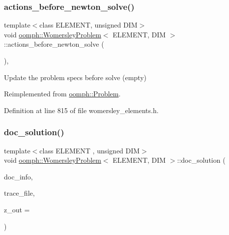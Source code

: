 \subsubsection{\texorpdfstring{actions\+\_\+before\+\_\+newton\+\_\+solve()}{actions\_before\_newton\_solve()}}
{\footnotesize\ttfamily template$<$class E\+L\+E\+M\+E\+NT, unsigned D\+IM$>$ \\
void \hyperlink{classoomph_1_1WomersleyProblem}{oomph\+::\+Womersley\+Problem}$<$ E\+L\+E\+M\+E\+NT, D\+IM $>$\+::actions\+\_\+before\+\_\+newton\+\_\+solve (\begin{DoxyParamCaption}{ }\end{DoxyParamCaption})\hspace{0.3cm}{\ttfamily [inline]}, {\ttfamily [virtual]}}



Update the problem specs before solve (empty) 



Reimplemented from \hyperlink{classoomph_1_1Problem_a0c8d70891f7369bb4bf8412fa1a08ecb}{oomph\+::\+Problem}.



Definition at line 815 of file womersley\+\_\+elements.\+h.

\mbox{\label{classoomph_1_1WomersleyProblem_a6ed55a744929154a6b8d3b7bb9f0570a}} 
\subsubsection{\texorpdfstring{doc\+\_\+solution()}{doc\_solution()}\hspace{0.1cm}{\footnotesize\ttfamily [1/2]}}
{\footnotesize\ttfamily template$<$class E\+L\+E\+M\+E\+NT , unsigned D\+IM$>$ \\
void \hyperlink{classoomph_1_1WomersleyProblem}{oomph\+::\+Womersley\+Problem}$<$ E\+L\+E\+M\+E\+NT, D\+IM $>$\+::doc\+\_\+solution (\begin{DoxyParamCaption}\item[{\hyperlink{classoomph_1_1DocInfo}{Doc\+Info} \&}]{doc\+\_\+info,  }\item[{std\+::ofstream \&}]{trace\+\_\+file,  }\item[{const double \&}]{z\+\_\+out = {} }\end{DoxyParamCaption})}



